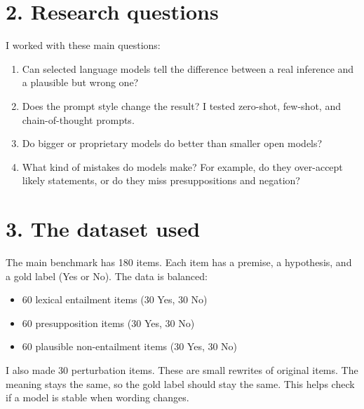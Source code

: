 \documentclass[11pt, a4paper]{article}
\begin{document}
\section*{\color{bambergnavy} 2. Research questions}
I worked with these main questions:
\begin{enumerate}[leftmargin=*]
    \item Can selected language models tell the difference between a real inference and a plausible but wrong one?
    \item Does the prompt style change the result? I tested zero-shot, few-shot, and chain-of-thought prompts.
    \item Do bigger or proprietary models do better than smaller open models?
    \item What kind of mistakes do models make? For example, do they over-accept likely statements, or do they miss presuppositions and negation?
\end{enumerate}

\FloatBarrier
{}
\section*{\color{bambergnavy} 3. The dataset used}
The main benchmark has 180 items. Each item has a premise, a hypothesis, and a gold label (Yes or No). The data is balanced:
\begin{itemize}[leftmargin=*]
    \item 60 lexical entailment items (30 Yes, 30 No)
    \item 60 presupposition items (30 Yes, 30 No)
    \item 60 plausible non-entailment items (30 Yes, 30 No)
\end{itemize}
I also made 30 perturbation items. These are small rewrites of original items. The meaning stays the same, so the gold label should stay the same. This helps check if a model is stable when wording changes.
\end{document}
